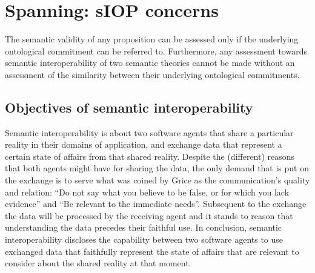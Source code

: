 \documentclass[sort&compress,preprint,authoryear,3p,twocolumn]{elsarticle}
\begin{document}
\hypertarget{spanning-siop-concerns}{%
\section{Spanning: sIOP concerns}\label{spanning-siop-concerns}}

The semantic validity of any proposition can be assessed only if the
underlying ontological commitment can be referred to. Furthermore, any
assessment towards semantic interoperability of two semantic theories
cannot be made without an assessment of the similarity between their
underlying ontological commitments.

\hypertarget{objectives-of-semantic-interoperability}{%
\subsection{Objectives of semantic
interoperability}\label{objectives-of-semantic-interoperability}}

Semantic interoperability is about two software agents that share a
particular reality in their domains of application, and exchange data
that represent a certain state of affairs from that shared reality.
Despite the (different) reasons that both agents might have for sharing
the data, the only demand that is put on the exchange is to serve what
was coined by Grice as the communication's quality and relation: ``Do
not say what you believe to be false, or for which you lack evidence''
and ``Be relevant to the immediate needs''. Subsequent to the exchange
the data will be processed by the receiving agent and it stands to
reason that understanding the data precedes their faithful use. In
conclusion, semantic interoperability discloses the capability between
two software agents to use exchanged data that faithfully represent the
state of affairs that are relevant to consider about the shared reality
at that moment.
\end{document}
